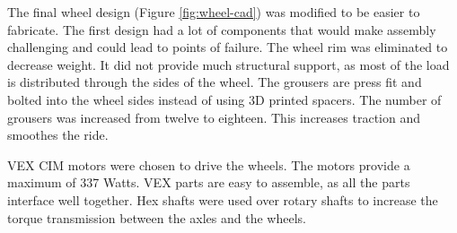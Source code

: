 \documentclass[class=article, crop=false]{standalone}
\begin{document}
	The final wheel design (Figure \ref{fig:wheel-cad}) was modified to be easier to fabricate. The first design had a lot of components that would make assembly challenging and could lead to points of failure. The wheel rim was eliminated to decrease weight. It did not provide much structural support, as most of the load is distributed through the sides of the wheel. The grousers are press fit and bolted into the wheel sides instead of using 3D printed spacers. The number of grousers was increased from twelve to eighteen. This increases traction and smoothes the ride. 

	VEX CIM motors were chosen to drive the wheels. The motors provide a maximum of 337 Watts. VEX parts are easy to assemble, as all the parts interface well together. Hex shafts were used over rotary shafts to increase the torque transmission between the axles and the wheels.
	
\end{document}
